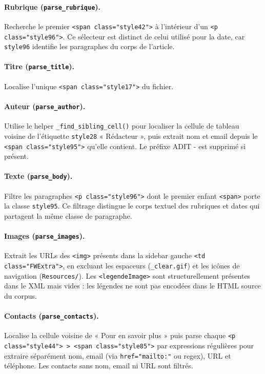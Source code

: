 \paragraph{Rubrique (\texttt{parse\_rubrique}).}
Recherche le premier \texttt{<span class="style42">} à l'intérieur d'un
\texttt{<p class="style96">}. Ce sélecteur est distinct de celui utilisé pour la date,
car \texttt{style96} identifie les paragraphes du corps de l'article.

\paragraph{Titre (\texttt{parse\_title}).}
Localise l'unique \texttt{<span class="style17">} du fichier.

\paragraph{Auteur (\texttt{parse\_author}).}
Utilise le helper \texttt{\_find\_sibling\_cell()} pour localiser la cellule de tableau
voisine de l'étiquette \texttt{style28} « Rédacteur », puis extrait nom et email depuis
le \texttt{<span class="style95">} qu'elle contient. Le préfixe \og{}ADIT - \fg{} est
supprimé si présent.

\paragraph{Texte (\texttt{parse\_body}).}
Filtre les paragraphes \texttt{<p class="style96">} dont le premier enfant \texttt{<span>}
porte la classe \texttt{style95}. Ce filtrage distingue le corps textuel des rubriques et
dates qui partagent la même classe de paragraphe.

\paragraph{Images (\texttt{parse\_images}).}
Extrait les URLs des \texttt{<img>} présents dans la sidebar gauche
\texttt{<td class="FWExtra">}, en excluant les espaceurs (\texttt{\_clear.gif}) et les
icônes de navigation (\texttt{Resources/}). Les \texttt{<legendeImage>} sont
structurellement présentes dans le XML mais vides : les légendes ne sont pas encodées
dans le HTML source du corpus.

\paragraph{Contacts (\texttt{parse\_contacts}).}
Localise la cellule voisine de « Pour en savoir plus » puis parse chaque
\texttt{<p class="style44"> > <span class="style85">} par expressions régulières
pour extraire séparément nom, email (via \texttt{href="mailto:"} ou regex), URL et
téléphone. Les contacts sans nom, email ni URL sont filtrés.

